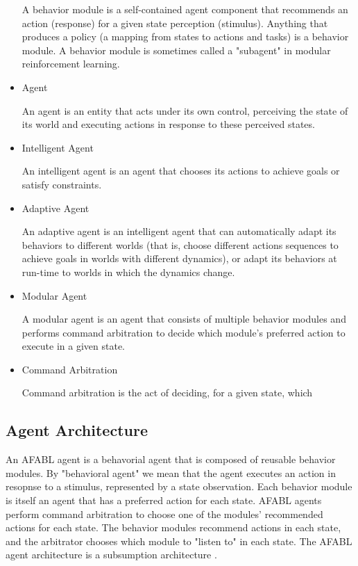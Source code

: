 \begin{itemize}
  A behavior module is a self-contained agent component that recommends an action (response) for a given state perception (stimulus).  Anything that produces a policy (a mapping from states to actions and tasks) is a behavior module.  A behavior module is sometimes called a "subagent" in modular reinforcement learning.

\item Agent

  An agent is an entity that acts under its own control, perceiving the state of its world and executing actions in response to these perceived states.

\item Intelligent Agent

  An intelligent agent is an agent that chooses its actions to achieve goals or satisfy constraints.

\item Adaptive Agent

  An adaptive agent is an intelligent agent that can automatically adapt its behaviors to different worlds (that is, choose different actions sequences to achieve goals in worlds with different dynamics), or adapt its behaviors at run-time to worlds in which the dynamics change.

\item Modular Agent

  A modular agent is an agent that consists of multiple behavior modules and performs command arbitration to decide which module's preferred action to execute in a given state.

\item Command Arbitration

  Command arbitration is the act of deciding, for a given state, which


\end{itemize}

\subsection{Agent Architecture}

An AFABL agent is a behavorial agent that is composed of reusable behavior modules.  By "behavioral agent" we mean that the agent executes an action in resopnse to a stimulus, represented by a state observation.  Each behavior module is itself an agent that has a preferred action for each state.  AFABL agents perform command arbitration to choose one of the modules' recommended actions for each state.  The behavior modules recommend actions in each state, and the arbitrator chooses which module to "listen to" in each state.  The AFABL agent architecture is a subsumption architecture \cite{brooks1986a-robust}.

